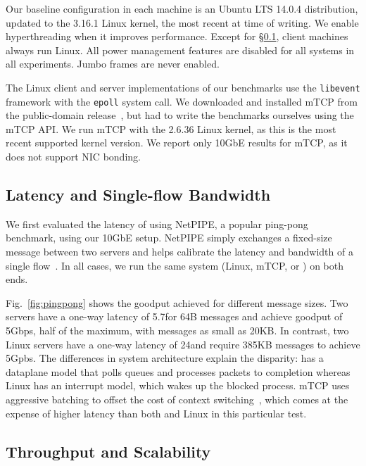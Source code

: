 Our baseline configuration in each
machine is an Ubuntu LTS 14.0.4 distribution, updated to the 3.16.1 Linux kernel, the most
recent at time of writing.
We enable hyperthreading when it improves performance. Except for
\S\ref{sec:eval:netpipe}, client machines always run Linux. All power
management features are disabled for all systems in all
experiments. Jumbo frames are never enabled.


The Linux client and server implementations of our benchmarks use the
\texttt{libevent} framework with the \texttt{epoll} system call.  We
downloaded and installed mTCP from the public-domain
release~\cite{url:mtcp}, but had to write the benchmarks ourselves
using the mTCP API.  We run mTCP with the 2.6.36 Linux kernel, as this
is the most recent supported kernel version.  We report only 10GbE
results for mTCP, as it does not support NIC bonding.


\subsection{Latency and Single-flow Bandwidth}
\label{sec:eval:netpipe}

We first evaluated the latency of \ix using NetPIPE, a popular
ping-pong benchmark, using our 10GbE setup.  NetPIPE simply exchanges
a fixed-size message between two servers and helps calibrate the
latency and bandwidth of a single flow~\cite{snell1996netpipe}.  In
all cases, we run the same system (Linux, mTCP, or \ix) on both ends.

Fig.~\ref{fig:pingpong} shows the goodput achieved for different
message sizes.  Two \ix servers have a one-way latency of
5.7\microsecond for 64B messages and achieve goodput of 5Gbps, half of
the maximum, with messages as small as 20KB. In contrast, two Linux
servers have a one-way latency of 24\microsecond and require 385KB
messages to achieve 5Gpbs.  The differences in system architecture
explain the disparity: \ix has a dataplane model that polls queues and
processes packets to completion whereas Linux has an interrupt model,
which wakes up the blocked process.  mTCP uses aggressive batching to
offset the cost of context switching~\cite{jeong2014mtcp}, which comes
  at the expense of higher latency than both \ix and Linux in this
  particular test.
 

  \subsection{Throughput and Scalability}
\label{sec:eval:short}

